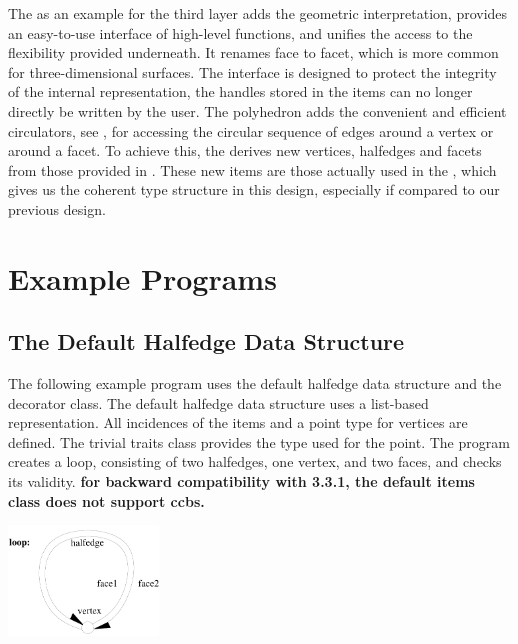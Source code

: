 The  as an example for the third layer adds the
geometric interpretation, provides an easy-to-use interface of
high-level functions, and unifies the access to the flexibility
provided underneath.  It renames face to facet, which is more common
for three-dimensional surfaces.  The interface is designed to protect
the integrity of the internal representation, the handles stored in
the items can no longer directly be written by the user.  The
polyhedron adds the convenient and efficient circulators, see
, for accessing the circular sequence of edges
around a vertex or around a facet. To achieve this, the
 derives new vertices, halfedges and facets from those
provided in .  These new items are those actually used in
the , which gives us the coherent type
structure in this design, especially if compared to our previous
design.


\section{Example Programs}
\label{sectionHdsExamples}


\subsection{The Default Halfedge Data Structure}

The following example program uses the default halfedge data structure
and the decorator class. The default halfedge data structure uses a
list-based representation. All incidences of the items and a point
type for vertices are defined. The trivial traits class provides the
type used for the point. The program creates a loop, consisting
of two halfedges, one vertex, and two faces, and checks its validity.
{\bf\ttfamily for backward compatibility with 3.3.1, the default items class
 does not support ccbs.}

\begin{ccTexOnly}
    \vspace{-4mm}
    \begin{center}
      \parbox{0.3\textwidth}{%
          \includegraphics[width=0.3\textwidth]{HalfedgeDS/fig/loop}%
      }
    \end{center}
    \vspace{-3mm}
\end{ccTexOnly}


